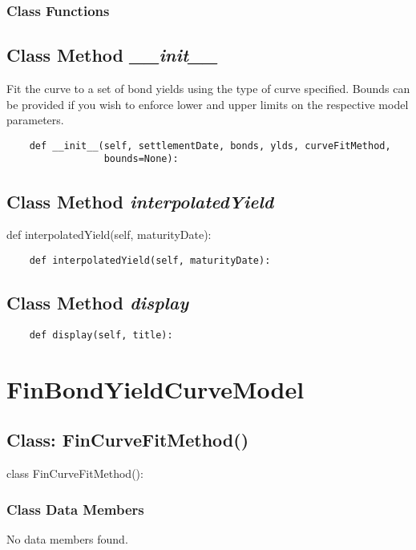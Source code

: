\documentclass[twoside,11pt]{book}
\begin{document}
\subsubsection{Class Functions}

\subsection{Class Method {\it \_\_init\_\_}}
Fit the curve to a set of bond yields using the type of curve specified. Bounds can be provided if you wish to enforce lower and upper limits on the respective model parameters. 

\begin{lstlisting}
    def __init__(self, settlementDate, bonds, ylds, curveFitMethod,
                 bounds=None):
\end{lstlisting}

\subsection{Class Method {\it interpolatedYield}}
def interpolatedYield(self, maturityDate):

\begin{lstlisting}
    def interpolatedYield(self, maturityDate):
\end{lstlisting}

\subsection{Class Method {\it display}}


\begin{lstlisting}
    def display(self, title):
\end{lstlisting}

\newpage
\section{FinBondYieldCurveModel}

\subsection{Class: FinCurveFitMethod()}
class FinCurveFitMethod():

\subsubsection{Class Data Members}
No data members found.
\end{document}
